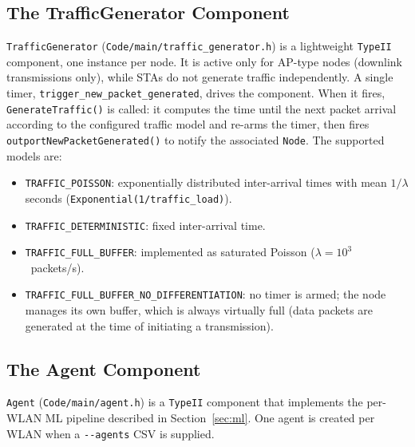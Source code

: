 \documentclass[11pt,a4paper]{article}
\begin{document}

\subsection{The TrafficGenerator Component}
\label{sec:traffic}

\texttt{TrafficGenerator} (\texttt{Code/main/traffic\_generator.h}) is a lightweight \texttt{TypeII} component, one instance per node.  It is active only for AP-type nodes (downlink transmissions only), while STAs do not generate traffic independently. A single timer, \texttt{trigger\_new\_packet\_generated}, drives the component.  When it fires, \texttt{GenerateTraffic()} is called: it computes the time until the next packet arrival according to the configured traffic model and re-arms the timer, then fires \texttt{outportNewPacketGenerated()} to notify the associated \texttt{Node}.  The supported models are:

\begin{itemize}
    \item \texttt{TRAFFIC\_POISSON}: exponentially distributed inter-arrival times with mean $1/\lambda$ seconds (\texttt{Exponential(1/traffic\_load)}).
    \item \texttt{TRAFFIC\_DETERMINISTIC}: fixed inter-arrival time.
    \item \texttt{TRAFFIC\_FULL\_BUFFER}: implemented as saturated Poisson ($\lambda = 10^3$~packets/s).
    \item \texttt{TRAFFIC\_FULL\_BUFFER\_NO\_DIFFERENTIATION}: no timer is armed; the node manages its own buffer, which is always virtually full (data packets are generated at the time of initiating a transmission).
\end{itemize}


\subsection{The Agent Component}
\label{sec:agent}

\texttt{Agent} (\texttt{Code/main/agent.h}) is a \texttt{TypeII} component that implements the per-WLAN ML pipeline described in Section~\ref{sec:ml}.  One agent is created per WLAN when a \texttt{-{}-agents} CSV is supplied.
\end{document}
